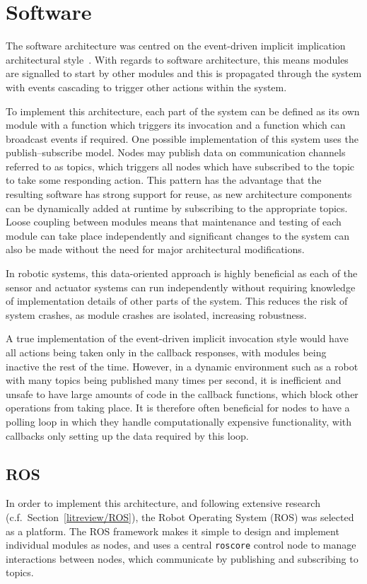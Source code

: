 
\chapter{Software}\label{software}
The software architecture was centred on the event-driven implicit implication
architectural style~\cite{garlan1993introduction}. With regards to software architecture, this means
modules are signalled to start by other modules and this is propagated through
the system with events cascading to trigger other actions within the system.

To implement this architecture, each part of the system can be defined as its own
module with a function which triggers its invocation and a function which can
broadcast events if required. One possible implementation of this system uses
the publish--subscribe model. Nodes may publish data on communication channels
referred to as topics, which triggers all nodes which have subscribed to the
topic to take some responding action. This pattern has the advantage that
the resulting software has strong support for reuse, as new architecture
components can be dynamically added at runtime by subscribing to the appropriate
topics. Loose coupling between modules means that maintenance and testing
of each module can take place independently and significant changes to the
system can also be made without the need for major architectural modifications.

In robotic systems, this data-oriented approach is highly beneficial as each of
the sensor
and actuator systems can run independently without requiring knowledge of
implementation details of other parts of the system. This
reduces the risk of system crashes, as module crashes are isolated, increasing
robustness.

A true implementation of the event-driven implicit invocation style would have all
actions being taken only in the callback responses, with modules being inactive
the rest of the time. However, in a dynamic environment such as a robot with many
topics being published many times per second, it is inefficient and unsafe to have
large amounts of code in the callback functions, which block other operations from
taking place. It is therefore often beneficial for nodes to have a polling loop
in which they handle computationally expensive functionality, with
callbacks only setting up the data required by this loop.

\section{ROS}\label{soft/ROS}
In order to implement this architecture, and following extensive research
(c.f.\ Section~\ref{litreview/ROS}), the Robot Operating System (ROS) was
selected as a platform. The ROS framework makes it simple to design and implement
individual modules as nodes, and uses a central \verb|roscore| control
node to manage interactions between nodes, which communicate by publishing and
subscribing to topics.

